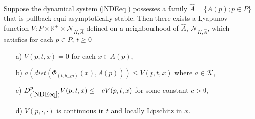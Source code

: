 \begin{therm} \hfill \\
\label{conpasthm}
Suppose the dynamical system (\ref{NDEeq}) possesses a family $\hat{A} =
 \{A(p) ; p \in P \}$ that is pullback equi-asymptotically stable.
Then there exists a Lyapunov function $V:P \times \mathbb{R}^+ \times
\mathcal{N}_{K, \hat{A}}$ defined on a neighbourhood of $\hat{A}$,
$\mathcal{N}_{K, \hat{A}}$, which satisfies for each $p \in P$, $t \geq 0$
\begin{itemize}
  \item[a)] $V(p, t, x) = 0$ for each $x \in A(p),$
  \item[b)] $a(dist( \Phi_{(t, \theta_{-t} p)}(x), A(p))) \leq V(p, t, x)$
    where $a \in \mathcal{K}$,
  \item[c)] $D^{p}_{(\ref{NDEeq})}V(p, t, x) \leq -cV(p, t, x)$ for some
    constant $c > 0$,
  \item[d)] $V(p, \cdot, \cdot)$ is continuous in $t$ and locally Lipschitz
  in $x$.
\end{itemize}
\end{therm}
